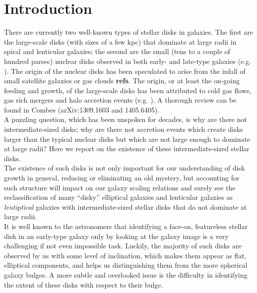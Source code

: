 \documentclass[12pt,preprint]{nature}
\begin{document}
\section{Introduction}

There are currently two well-known types of stellar disks in galaxies. 
The first are the large-scale disks (with sizes of a few kpc)  
that dominate at large radii in spiral and lenticular galaxies; 
the second are the small (tens to a couple of hundred parsec) nuclear disks 
observed in both early- and late-type galaxies
(e.g. \citealt{scorzavandenbosch1998,rest2001,balcells2007,ledo2010}).
The origin of the nuclear disks has been speculated to arise 
from the infall of small satellite galaxies or gas clouds {\bf refs}.  
The origin, or at least the on-going feeding and growth, of the large-scale disks 
has been attributed to cold gas flows, gas rich mergers and halo accretion events 
(e.g. \citealt{khochfarsilk2006,dekel2009nat,dekel2009apj,ceverino2010,ceverino2012,conselice2012}).  
A thorough review can be found in Combes (arXiv:1309.1603 and 1405.6405). \\

A puzzling question, which has been unspoken for decades, 
is why are there not intermediate-sized disks; 
why are there not accretion events which create disks larger than the typical nuclear disks 
but which are not large enough to dominate at large radii? 
Here we report on the existence of these intermediate-sized stellar disks. \\

The existence of such disks is not only important for our understanding of disk growth in general, 
reducing or eliminating an old mystery, 
but accounting for such structure will impact on our galaxy scaling relations 
and surely see the reclassification of many ``disky'' elliptical galaxies 
and lenticular galaxies as \emph{lentiptical} 
galaxies with intermediate-sized stellar disks that do not dominate at large radii. \\ 

It is well known to the astronomers that identifying a face-on, featureless stellar disk 
in an early-type galaxy only by looking at the galaxy image 
is a very challenging if not even impossible task. 
Luckily, the majority of such disks are observed by us with some level of inclination, 
which makes them appear as flat, elliptical components, 
and helps us distinguishing them from the more spherical galaxy bulges. 
A more subtle and overlooked issue is the difficulty in identifying the extent of these disks 
with respect to their bulge. 
\end{document}
